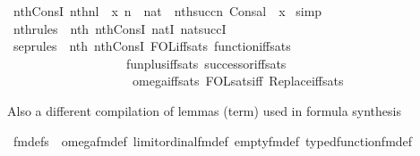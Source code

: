 \begin{isabellebody}
\isanewline
{}\isamarkupfalse%
\ nth{\isacharunderscore}{\kern0pt}ConsI{\isacharcolon}{\kern0pt}\ {\isachardoublequoteopen}{\isasymlbrakk}nth{\isacharparenleft}{\kern0pt}n{\isacharcomma}{\kern0pt}l{\isacharparenright}{\kern0pt}\ {\isacharequal}{\kern0pt}\ x{\isacharsemicolon}{\kern0pt}\ n\ {\isasymin}\ nat{\isasymrbrakk}\ {\isasymLongrightarrow}\ nth{\isacharparenleft}{\kern0pt}succ{\isacharparenleft}{\kern0pt}n{\isacharparenright}{\kern0pt}{\isacharcomma}{\kern0pt}\ Cons{\isacharparenleft}{\kern0pt}a{\isacharcomma}{\kern0pt}l{\isacharparenright}{\kern0pt}{\isacharparenright}{\kern0pt}\ {\isacharequal}{\kern0pt}\ x{\isachardoublequoteclose}\isanewline
%
\isadelimproof
%
\endisadelimproof
%
\isatagproof
{}\isamarkupfalse%
\ simp%
\endisatagproof
{\isafoldproof}%
%
\isadelimproof
\isanewline
%
\endisadelimproof
\isanewline
{}\isamarkupfalse%
\ nth{\isacharunderscore}{\kern0pt}rules\ {\isacharequal}{\kern0pt}\ nth{\isacharunderscore}{\kern0pt}{}\ nth{\isacharunderscore}{\kern0pt}ConsI\ nat{\isacharunderscore}{\kern0pt}{}I\ nat{\isacharunderscore}{\kern0pt}succI\isanewline
{}\isamarkupfalse%
\ sep{\isacharunderscore}{\kern0pt}rules\ {\isacharequal}{\kern0pt}\ nth{\isacharunderscore}{\kern0pt}{}\ nth{\isacharunderscore}{\kern0pt}ConsI\ FOL{\isacharunderscore}{\kern0pt}iff{\isacharunderscore}{\kern0pt}sats\ function{\isacharunderscore}{\kern0pt}iff{\isacharunderscore}{\kern0pt}sats\isanewline
\ \ \ \ \ \ \ \ \ \ \ \ \ \ \ \ \ \ \ fun{\isacharunderscore}{\kern0pt}plus{\isacharunderscore}{\kern0pt}iff{\isacharunderscore}{\kern0pt}sats\ successor{\isacharunderscore}{\kern0pt}iff{\isacharunderscore}{\kern0pt}sats\isanewline
\ \ \ \ \ \ \ \ \ \ \ \ \ \ \ \ \ \ \ \ omega{\isacharunderscore}{\kern0pt}iff{\isacharunderscore}{\kern0pt}sats\ FOL{\isacharunderscore}{\kern0pt}sats{\isacharunderscore}{\kern0pt}iff\ Replace{\isacharunderscore}{\kern0pt}iff{\isacharunderscore}{\kern0pt}sats%
\begin{isamarkuptext}%
Also a different compilation of lemmas (term) used in formula
 synthesis%
\end{isamarkuptext}\isamarkuptrue%
\isamarkupfalse%
\ fm{\isacharunderscore}{\kern0pt}defs\ {\isacharequal}{\kern0pt}\ omega{\isacharunderscore}{\kern0pt}fm{\isacharunderscore}{\kern0pt}def\ limit{\isacharunderscore}{\kern0pt}ordinal{\isacharunderscore}{\kern0pt}fm{\isacharunderscore}{\kern0pt}def\ empty{\isacharunderscore}{\kern0pt}fm{\isacharunderscore}{\kern0pt}def\ typed{\isacharunderscore}{\kern0pt}function{\isacharunderscore}{\kern0pt}fm{\isacharunderscore}{\kern0pt}def\isanewline

\end{isabellebody}
